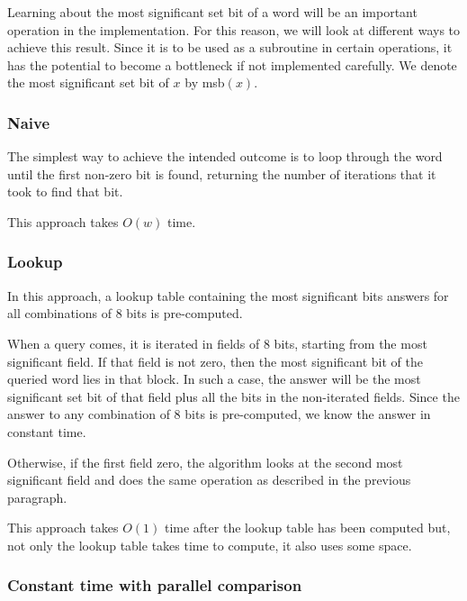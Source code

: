 Learning about the most significant set bit of a word will be an important operation in the implementation. For this reason, we will look at different ways to achieve this result. Since it is to be used as a subroutine in certain operations, it has the potential to become a bottleneck if not implemented carefully. We denote the most significant set bit of $x$ by msb$(x)$.

\subsubsection{Naive}

The simplest way to achieve the intended outcome is to loop through the word until the first non-zero bit is found, returning the number of iterations that it took to find that bit.

This approach takes $O(w)$ time.

\subsubsection{Lookup}

In this approach, a lookup table containing the most significant bits answers for all combinations of 8 bits is pre-computed.

When a query comes, it is iterated in fields of 8 bits, starting from the most significant field. If that field is not zero, then the most significant bit of the queried word lies in that block. In such a case, the answer will be the most significant set bit of that field plus all the bits in the non-iterated fields. Since the answer to any combination of 8 bits is pre-computed, we know the answer in constant time.

Otherwise, if the first field zero, the algorithm looks at the second most significant field and does the same operation as described in the previous paragraph.

This approach takes $O(1)$ time after the lookup table has been computed but, not only the lookup table takes time to compute, it also uses some space.

\subsubsection{Constant time with parallel comparison} \label{sec:msbO1}

